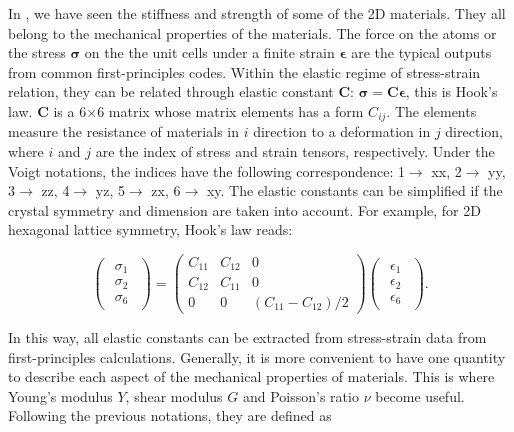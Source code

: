 In , we have seen the stiffness and strength of some of the 2D materials. They all belong to the mechanical properties of the materials. The force on the atoms or the stress $\boldsymbol{\sigma}$ on the the unit cells under a finite strain $\boldsymbol{\epsilon}$ are the typical outputs from common first-principles codes. Within the elastic regime of stress-strain relation, they can be related through elastic constant $\boldsymbol{C}$: $\boldsymbol{\sigma}=\boldsymbol{C}\boldsymbol{\epsilon}$, this is Hook's law. $\boldsymbol{C}$ is a 6$\times$6 matrix whose matrix elements has a form $C_{ij}$. The elements measure the resistance of materials in $i$ direction to a deformation in $j$ direction, where $i$ and $j$ are the index of stress and strain tensors, respectively.  Under the Voigt notations, the indices have the following correspondence: 1$\rightarrow$ xx, 2$\rightarrow$ yy, 3$\rightarrow$ zz, 4$\rightarrow$ yz, 5$\rightarrow$ zx, 6$\rightarrow$ xy. The elastic constants can be simplified if the crystal symmetry and dimension are taken into account. For example, for 2D hexagonal lattice symmetry, Hook's law reads:

\begin{equation}
\begin{pmatrix} \begin{array}{c} \sigma_1 \\ \sigma_2 \\ \sigma_6 \end{array} 
\end{pmatrix}
=
 \begin{pmatrix}
  C_{11} & C_{12} & 0  \\
  C_{12} & C_{11} & 0  \\
  0 & 0 & (C_{11}-C_{12})/2
 \end{pmatrix}
 \begin{pmatrix} \begin{array}{c} \epsilon_1 \\ \epsilon_2 \\ \epsilon_6 
\end{array} \end{pmatrix}.
\end{equation} 

In this way, all elastic constants can be extracted from stress-strain data from first-principles calculations. Generally, it is more convenient to have one quantity to describe each aspect of the mechanical properties of materials. This is where Young's modulus $Y$, shear modulus $G$ and Poisson's ratio $\nu$ become useful. Following the previous notations, they are defined as 

